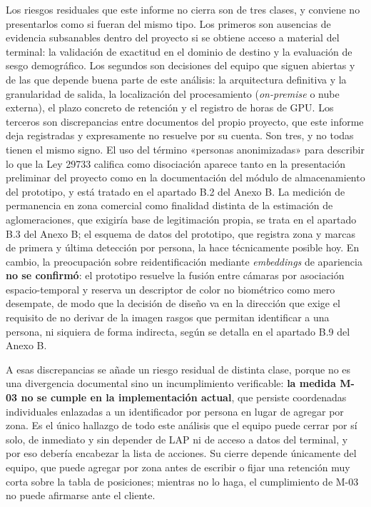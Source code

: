 Los riesgos residuales que este informe no cierra son de tres clases, y
conviene no presentarlos como si fueran del mismo tipo. Los primeros son
ausencias de evidencia subsanables dentro del proyecto si se obtiene
acceso a material del terminal: la validación de exactitud en el dominio
de destino y la evaluación de sesgo demográfico. Los segundos son
decisiones del equipo que siguen abiertas y de las que depende buena
parte de este análisis: la arquitectura definitiva y la granularidad de
salida, la localización del procesamiento (\emph{on-premise} o nube
externa), el plazo concreto de retención y el registro de horas de GPU.
Los terceros son discrepancias entre documentos del propio proyecto, que
este informe deja registradas y expresamente no resuelve por su cuenta.
Son tres, y no todas tienen el mismo signo. El uso del término «personas
anonimizadas» para describir lo que la Ley 29733 califica como
disociación aparece tanto en la presentación preliminar del proyecto
como en la documentación del módulo de almacenamiento del prototipo, y
está tratado en el apartado B.2 del Anexo B. La medición de permanencia
en zona comercial como finalidad distinta de la estimación de
aglomeraciones, que exigiría base de legitimación propia, se trata en el
apartado B.3 del Anexo B; el esquema de datos del prototipo, que
registra zona y marcas de primera y última detección por persona, la
hace técnicamente posible hoy. En cambio, la preocupación sobre
reidentificación mediante \emph{embeddings} de apariencia \textbf{no se
confirmó}: el prototipo resuelve la fusión entre cámaras por asociación
espacio-temporal y reserva un descriptor de color no biométrico como
mero desempate, de modo que la decisión de diseño va en la dirección que
exige el requisito de no derivar de la imagen rasgos que permitan
identificar a una persona, ni siquiera de forma indirecta, según se
detalla en el apartado B.9 del Anexo B.

A esas discrepancias se añade un riesgo residual de distinta clase,
porque no es una divergencia documental sino un incumplimiento
verificable: \textbf{la medida M-03 no se cumple en la implementación
actual}, que persiste coordenadas individuales enlazadas a un
identificador por persona en lugar de agregar por zona. Es el único
hallazgo de todo este análisis que el equipo puede cerrar por sí solo,
de inmediato y sin depender de LAP ni de acceso a datos del terminal, y
por eso debería encabezar la lista de acciones. Su cierre depende
únicamente del equipo, que puede agregar por zona antes de escribir o
fijar una retención muy corta sobre la tabla de posiciones; mientras no
lo haga, el cumplimiento de M-03 no puede afirmarse ante el cliente.
